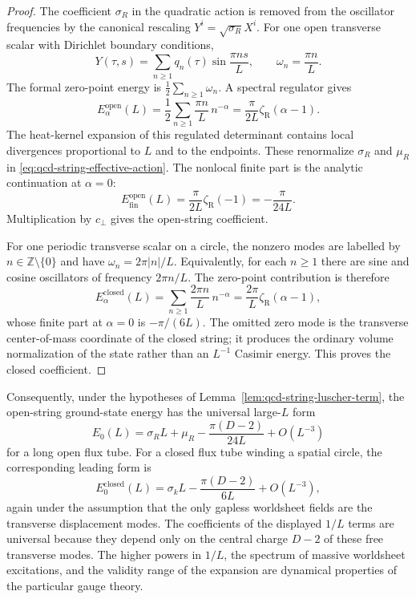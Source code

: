 \begin{proof}
The coefficient \(\sigma_R\) in the quadratic action is removed from the
oscillator frequencies by the canonical rescaling
\(Y^i=\sqrt{\sigma_R}X^i\).  For one open transverse scalar with Dirichlet
boundary conditions,
\[
  Y(\tau,s)=\sum_{n\ge1}q_n(\tau)\sin\frac{\pi ns}{L},
  \qquad
  \omega_n=\frac{\pi n}{L}.
\]
The formal zero-point energy is
\(\frac12\sum_{n\ge1}\omega_n\).  A spectral regulator gives
\[
  E^{\mathrm{open}}_{\alpha}(L)
  =
  \frac12\sum_{n\ge1}\frac{\pi n}{L}\,n^{-\alpha}
  =
  \frac{\pi}{2L}\zeta_{\mathrm R}(\alpha-1).
\]
The heat-kernel expansion of this regulated determinant contains local
divergences proportional to \(L\) and to the endpoints.  These renormalize
\(\sigma_R\) and \(\mu_R\) in
\eqref{eq:qcd-string-effective-action}.  The nonlocal finite part is the
analytic continuation at \(\alpha=0\):
\[
  E^{\mathrm{open}}_{\mathrm{fin}}(L)
  =
  \frac{\pi}{2L}\zeta_{\mathrm R}(-1)
  =
  -\frac{\pi}{24L}.
\]
Multiplication by \(c_\perp\) gives the open-string coefficient.

For one periodic transverse scalar on a circle, the nonzero modes are labelled
by \(n\in\mathbb Z\setminus\{0\}\) and have
\(\omega_n=2\pi |n|/L\).  Equivalently, for each \(n\ge1\) there are sine and
cosine oscillators of frequency \(2\pi n/L\).  The zero-point contribution is
therefore
\[
  E^{\mathrm{closed}}_{\alpha}(L)
  =
  \sum_{n\ge1}\frac{2\pi n}{L}\,n^{-\alpha}
  =
  \frac{2\pi}{L}\zeta_{\mathrm R}(\alpha-1),
\]
whose finite part at \(\alpha=0\) is \(-\pi/(6L)\).  The omitted zero mode is
the transverse center-of-mass coordinate of the closed string; it produces the
ordinary volume normalization of the state rather than an \(L^{-1}\) Casimir
energy.  This proves the closed coefficient.
\end{proof}

Consequently, under the hypotheses of
Lemma~\ref{lem:qcd-string-luscher-term}, the open-string ground-state
energy has the universal large-\(L\) form
\begin{equation}
  E_0(L)
  =
  \sigma_R L+\mu_R
  -\frac{\pi(D-2)}{24L}
  +O(L^{-3})
  \label{eq:qcd-string-open-luscher}
\end{equation}
for a long open flux tube.  For a closed flux tube winding a spatial circle,
the corresponding leading form is
\begin{equation}
  E_0^{\mathrm{closed}}(L)
  =
  \sigma_k L
  -\frac{\pi(D-2)}{6L}
  +O(L^{-3}),
  \label{eq:qcd-string-closed-luscher}
\end{equation}
again under the assumption that the only gapless worldsheet fields are the
transverse displacement modes.  The coefficients of the displayed \(1/L\)
terms are universal because they depend only on the central charge \(D-2\) of
these free transverse modes.  The higher powers in \(1/L\), the spectrum of
massive worldsheet excitations, and the validity range of the expansion are
dynamical properties of the particular gauge theory.

